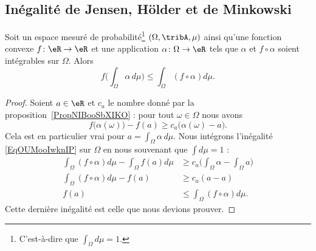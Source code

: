 \subsection{Inégalité de Jensen, Hölder et de Minkowski}

\begin{proposition} \label{PropXISooBxdaLk}
    Soit un espace mesuré de probabilité\footnote{C'est-à-dire que \( \int_{\Omega}d\mu=1\).} \( (\Omega,\tribA,\mu)\) ainsi qu'une fonction convexe \( f\colon \eR\to \eR\) et une application \( \alpha\colon \Omega\to \eR\) tels que \( \alpha\) et \( f\circ \alpha\) soient intégrables sur \( \Omega\). Alors
    \begin{equation}
        f\Big( \int_{\Omega}\alpha\,d\mu \Big)\leq \int_{\Omega}(f\circ\alpha) d\mu.
    \end{equation}
\end{proposition}

\begin{proof}
    Soient \( a\in \eR\) et \( c_a\) le nombre donné par la proposition~\ref{PropNIBooSbXIKO} : pour tout \( \omega\in \Omega\) nous avons
    \begin{equation}    \label{EqOUMooIwknIP}
        f\big( \alpha(\omega) \big)-f(a)\geq c_a\big( \alpha(\omega)-a \big).
    \end{equation}
    Cela est en particulier vrai pour \( a=\int_{\Omega}\alpha\,d\mu\). Nous intégrons l'inégalité \eqref{EqOUMooIwknIP} sur \( \Omega\) en nous souvenant que \( \int d\mu=1\) :
    \begin{subequations}
        \begin{align}
            \int_{\Omega}(f\circ \alpha)d\mu-\int_{\Omega}f(a)d\mu&\geq c_a\big( \int_{\Omega}\alpha-\int_{\Omega}a \big)\\
            \int_{\Omega}(f\circ \alpha)d\mu-f(a)&\geq c_a(a-a)\\
            f(a)&\leq \int_{\Omega}(f\circ\alpha)d\mu.
        \end{align}
    \end{subequations}
    Cette dernière inégalité est celle que nous devions prouver.
\end{proof}

